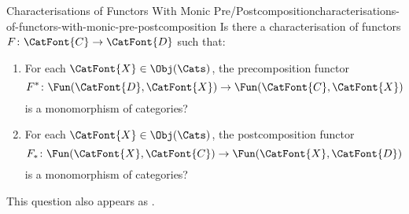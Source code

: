 \begin{question}{Characterisations of Functors With Monic Pre/Postcomposition}{characterisations-of-functors-with-monic-pre-postcomposition}%
    Is there a characterisation of functors $F\colon\CatFont{C}\to\CatFont{D}$ such that:
    \begin{enumerate}
        \item\label{characterisations-of-functors-with-monic-pre-postcomposition-a}For each $\CatFont{X}\in\Obj(\Cats)$, the precomposition functor
            \[
                F^{*}%
                \colon%
                \Fun(\CatFont{D},\CatFont{X})%
                \to%
                \Fun(\CatFont{C},\CatFont{X})%
            \]%
            is a monomorphism of categories?
        \item\label{characterisations-of-functors-with-monic-pre-postcomposition-b}For each $\CatFont{X}\in\Obj(\Cats)$, the postcomposition functor
            \[
                F_{*}%
                \colon%
                \Fun(\CatFont{X},\CatFont{C})%
                \to%
                \Fun(\CatFont{X},\CatFont{D})%
            \]%
            is a monomorphism of categories?
    \end{enumerate}
    This question also appears as \cite{MO468125}.
\end{question}
